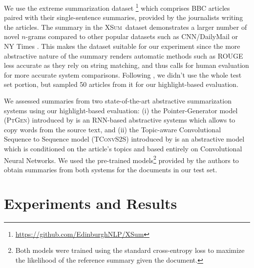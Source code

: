 \documentclass[11pt,a4paper]{article}
\newcommand\ptgen{\textsc{PtGen}}
\newcommand\tconv{\textsc{TConvS2S}}
\newcommand\xsum{\textsc{XSum}}
\begin{document}
We use the extreme summarization dataset \citep[\xsum,][]{narayan18xsum}\footnote{\url{https://github.com/EdinburghNLP/XSum}} which comprises BBC articles paired with their single-sentence summaries, provided by the journalists writing the articles. The summary in the \xsum\ dataset demonstrates a larger number of novel $n$-grams compared to other popular datasets such as CNN/DailyMail \citep{Hermann2015} or NY Times \citep{Sandhaus2008}. This makes the dataset suitable for our experiment since the more abstractive nature of the summary renders automatic methods such as ROUGE less accurate as they rely on string matching, and thus calls for human evaluation for more accurate system comparisons. 
Following \citet{narayan18xsum}, we didn't use the whole test set portion, but sampled 50 articles from it for our highlight-based evaluation.  


We assessed summaries from two state-of-the-art abstractive summarization systems using our highlight-based evaluation: (i) the Pointer-Generator model (\ptgen) introduced by \citet{See2017} is an RNN-based abstractive systems which allows to copy words from the source text, and (ii) the Topic-aware Convolutional Sequence to Sequence model (\tconv) introduced by \citet{narayan18xsum} is an   abstractive model which is conditioned on the article's topics and based entirely on Convolutional Neural Networks.
We used the pre-trained models\footnote{Both models were trained using the standard cross-entropy loss to maximize the likelihood of the reference summary given the document.} provided by the authors to obtain summaries from both systems for the documents in our test set.


\section{Experiments and Results}
\label{sec:exp-res}
\end{document}
